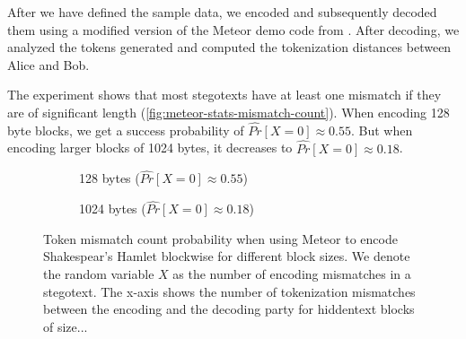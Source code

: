 After we have defined the sample data, we encoded and subsequently decoded them using a modified version of the Meteor demo code from \cite{MeteorDemo2021}.
After decoding, we analyzed the tokens generated and computed the tokenization distances between Alice and Bob.

The experiment shows that most stegotexts have at least one mismatch if they are of significant length (\autoref{fig:meteor-stats-mismatch-count}).
When encoding 128 byte blocks, we get a success probability of $\hat{Pr}[X=0] \approx 0.55$.
But when encoding larger blocks of 1024 bytes, it decreases to $\hat{Pr}[X=0] \approx 0.18$.

\begin{figure}[htbp]%
	\begin{subfigure}{.5\textwidth}%
		\centering%
	    \resizebox{0.9\linewidth}{!}{%
		}%
		\caption{128 bytes ($\hat{Pr}[X=0] \approx 0.55$)}%
	\end{subfigure}%
	\begin{subfigure}{.5\textwidth}%
		\centering%
	    \resizebox{0.9\linewidth}{!}{%
		}%
		\caption{1024 bytes ($\hat{Pr}[X=0] \approx 0.18$)}%
	\end{subfigure}%
	\caption{
	Token mismatch count probability when using Meteor to encode Shakespear's Hamlet blockwise for different block sizes.
	We denote the random variable $X$ as the number of encoding mismatches in a stegotext.
	The x-axis shows the number of tokenization mismatches between the encoding and the decoding party for hiddentext blocks of size...}
	\label{fig:meteor-stats-mismatch-count}	
\end{figure}


